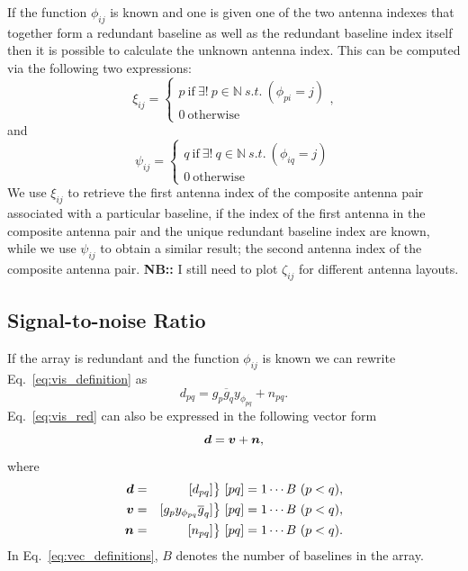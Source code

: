 \documentclass[useAMS,usenatbib]{mn2e}
\newcommand{\bd}{\bmath{d}}
\newcommand{\bv}{\bmath{v}}
\newcommand{\bn}{\bmath{n}}
\newcommand{\conj}[1]{\overline{#1}}
\begin{document}
If the function $\phi_{ij}$ is known and one is given one of the two antenna indexes that together form a redundant baseline as well as the redundant baseline index itself then it is possible 
to calculate the unknown antenna index. This can be computed via the following two expressions:
\begin{equation}
\xi_{ij} = 
\begin{cases}
p~\textrm{if}~\exists! ~ p \in \mathbb{N} ~ s.t. ~(\phi_{pi} = j)\\
0~\textrm{otherwise}
\end{cases},
\end{equation}
and
\begin{equation}
\psi_{ij} = 
\begin{cases}
q~\textrm{if}~\exists! ~ q \in \mathbb{N} ~ s.t. ~(\phi_{iq} = j)\\
0~\textrm{otherwise}
\end{cases}
\end{equation}
We use $\xi_{ij}$ to retrieve the first antenna index of the composite antenna pair associated with a particular baseline, if the index of the first antenna in the composite antenna pair and the unique redundant baseline index are known, while we use $\psi_{ij}$ to obtain 
a similar result; the second antenna index of the composite antenna pair. \textbf{NB::} I still need to plot $\zeta_{ij}$ for different antenna layouts.

\subsection{Signal-to-noise Ratio}
If the array is redundant and the function $\phi_{ij}$ is known we can rewrite Eq.~\eqref{eq:vis_definition} as
\begin{equation}
\label{eq:vis_red}
d_{pq} = g_{p}\conj{g}_{q}y_{\phi_{pq}} + n_{pq}.
\end{equation}
Eq.~\eqref{eq:vis_red} can also be expressed in the following vector form 
\begin{equation}
\bd = \bv + \bn, 
\end{equation}
where 
\begin{eqnarray}
 \bd &=& [d_{pq}] \big \} ~ [pq] = 1\cdots B ~ (p<q),\nonumber\\
 \bv &=& [g_p y_{\phi_{pq}} \conj{g}_q]  \big \} ~ [pq] = 1\cdots B ~ (p<q),\nonumber\\
 \bn &=& [n_{pq}]  \big \} ~ [pq] = 1\cdots B ~ (p<q).\label{eq:vec_definitions}
\end{eqnarray}
In Eq.~\eqref{eq:vec_definitions}, $B$ denotes the number of baselines in the array.
\end{document}
